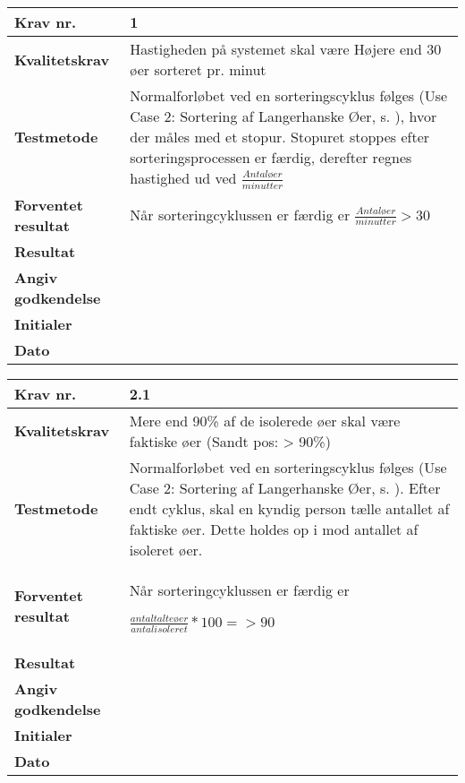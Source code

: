 
 	\begin{center}
		\begin{longtable}{ | m{4cm}| m{8.5cm}|} 
			\hline
			\textbf{Krav nr.} & 1 \\ 
			\hline
			\textbf{Kvalitetskrav} & Hastigheden på systemet skal være Højere end 30 øer sorteret pr. minut \\
			\hline
			\textbf{Testmetode} & Normalforløbet ved en sorteringscyklus følges (Use Case 2: Sortering af Langerhanske Øer, s. \pageref{uc:2}), hvor der måles med et stopur. Stopuret stoppes efter sorteringsprocessen er færdig, derefter regnes hastighed ud ved 
$\frac{Antal øer}{minutter}$  \\
			\hline
			\textbf{Forventet resultat}  & Når sorteringcyklussen er færdig er
			$\frac{Antal øer}{minutter}>30$  \\
			\hline
			\textbf{Resultat}  &    \\
			\hline
			\textbf{Angiv godkendelse} &     \\
			\hline
			\textbf{Initialer} &     \\
			\hline
			\textbf{Dato} &    \\
			\hline
		\end{longtable}
	\end{center}
			
 	\begin{center}
		\begin{longtable}{ | m{4cm}| m{8.5cm}|} 
			\hline
			\textbf{Krav nr.} & 2.1 \\ 
			\hline
			\textbf{Kvalitetskrav} & Mere end 90\% af de isolerede øer skal være faktiske øer 
(Sandt pos: > 90\%) \\
			\hline
			\textbf{Testmetode} & Normalforløbet ved en sorteringscyklus følges (Use Case 2: Sortering af Langerhanske Øer, s. \pageref{uc:2}). Efter endt cyklus, skal en kyndig person tælle antallet af faktiske øer. Dette holdes op i mod antallet af isoleret øer.  \\
			\hline
			\textbf{Forventet resultat}  & Når sorteringcyklussen er færdig er

 $\frac{antal talte øer}{antal isoleret}*100=>90$  \\
			\hline
			\textbf{Resultat}  &    \\
			\hline
			\textbf{Angiv godkendelse} &     \\
			\hline
			\textbf{Initialer} &     \\
			\hline
			\textbf{Dato} &    \\
			\hline
		\end{longtable}
	\end{center}		

